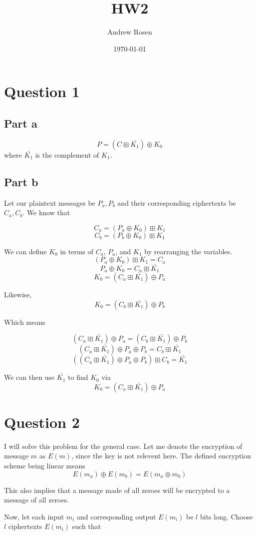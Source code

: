 \documentclass[a4paper,10pt]{article}
\title{HW2}
\author{Andrew Rosen}
\date{\today}
\begin{document}
\section{Question 1}

\subsection{Part a}
$$P = (C \boxplus \bar{K_{1}}) \oplus K_{0}$$ where $\bar{K_{1}}$ is the complement of $K_{1}$. 
\subsection{Part b}
Let our plaintext messages be $P_{a}, P_{b} $ and their corresponding ciphertexts be $C_{a}, C_{b}$.  We know that

$$ C_{a} = (P_{a} \oplus K_{0}) \boxplus K_{1} $$
$$ C_{b} = (P_{b} \oplus K_{0}) \boxplus K_{1} $$

We can define $K_{0}$ in terms of $C_{a}$, $P_{a}$, and $K_{1}$ by rearranging the variables.   
$$ (P_{a} \oplus K_{0}) \boxplus K_{1}  = C_{a} $$
$$  P_{a} \oplus K_{0} = C_{a} \boxplus \bar{K_{1}} $$
$$  K_{0} = (C_{a} \boxplus \bar{K_{1}}) \oplus P_{a} $$

Likewise,
$$  K_{0} = (C_{b} \boxplus \bar{K_{1}}) \oplus P_{b} $$

Which means

$$(C_{a} \boxplus \bar{K_{1}}) \oplus P_{a} = (C_{b} \boxplus \bar{K_{1}}) \oplus P_{b} $$
$$(C_{a} \boxplus \bar{K_{1}}) \oplus P_{a} \oplus P_{b} = C_{b} \boxplus \bar{K_{1}}$$
$$\left(\left(C_{a} \boxplus \bar{K_{1}}\right) \oplus P_{a} \oplus P_{b}\right) \boxplus C_{b} =  \bar{K_{1}}$$

We can then use  $\bar{K_{1}}$ to find $K_{0}$ via
$$  K_{0} = (C_{a} \boxplus \bar{K_{1}}) \oplus P_{a} $$
\section{Question 2}

I will solve this problem for the general case.  Let me denote the encryption of message $m$ as $E(m)$, since the key is not relevent here.  The defined encryption scheme being linear means 
$$E(m_{a}) \oplus E(m_{b})  =  E(m_{a} \oplus m_{b})$$

This also implies that a message made of all zeroes will be encrypted to a message of all zeroes.

Now, let each input $m_{i}$ and corresponding output $E(m_{i})$ be $l$ bits long.  Choose $l$ ciphertexts $E(m_{i})$ such that
\end{document}
